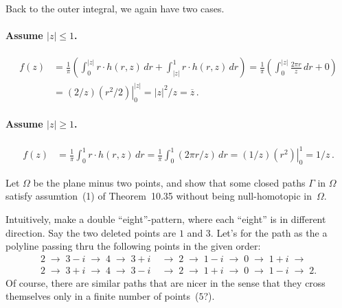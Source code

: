 \begin{enumerate}
Back to the outer integral, we again have two cases.
\paragraph{Assume \(|z|\leq 1\).}
\begin{align*}
f(z) 
&= \frac{1}{\pi} \left(
   \int_0^{|z|} r\cdot h(r,z)\,dr + \int_{|z|}^1 r\cdot h(r,z)\,dr \right) 
 = \frac{1}{\pi} \left(
      \int_0^{|z|} \frac{2\pi r}{z}\,dr +  0\right) \\
&= (2/z) \left.\left(r^2/2\right)\right|_0^{|z|}
 = |z|^2/z
 = \overline{z}\,.
\end{align*}

\paragraph{Assume \(|z|\geq 1\).}
\begin{align*}
f(z) 
&= \frac{1}{\pi} \int_0^1 r\cdot h(r,z)\,dr 
 = \frac{1}{\pi} \int_0^1 (2\pi r/z) \,dr 
 = (1/z)\left.\left(r^2\right)\right|_{0}^1
 = 1/z\,.
\end{align*}


\begin{excopy}
Let \(\Omega\) be the plane minus two points, and show that some closed paths
\(\Gamma\) in \(\Omega\) satisfy assumtion~(1) of Theorem~10.35 without being
null-homotopic in~\(\Omega\).
\end{excopy}

Intuitively, make a double ``eight''-pattern, where each ``eight''
is in different direction.
Say the two deleted points are $1$ and $3$.
Let's for the path as the a polyline passing thru the following
points in the given order:
{\newcommand{\qtoq}{\;\to\;}
\begin{align*}
2 \qtoq 3-i \qtoq 4 \qtoq 3+i &\qtoq 2 \qtoq 1-i \qtoq 0 \qtoq 1+i \qtoq \\
2 \qtoq 3+i \qtoq 4 \qtoq 3-i &\qtoq 2 \qtoq 1+i \qtoq 0 \qtoq 1-i \qtoq 2.
\end{align*}
}
Of course, there are similar paths that are nicer
in the sense that they cross themselves only 
in a finite number of points~($5$?).

\end{enumerate}


